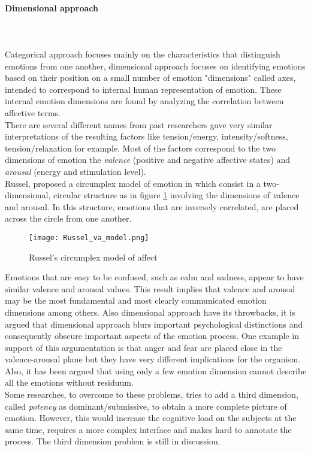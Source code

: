 \paragraph{Dimensional approach}
\mbox{} \\ \\ \indent
Categorical approach focuses mainly on the characteristics that distinguish emotions from one another, dimensional approach focuses on identifying emotions based on their position on a small number of emotion "dimensions" called axes, intended to correspond to internal human representation of emotion. These internal emotion dimensions are found by analyzing the correlation between affective terms.
\\ \indent
There are several different names from past researchers gave very similar interpretations of the resulting factors like tension/energy, intensity/softness, tension/relaxation for example. Most of the factors correspond to the two dimensions of emotion the \textit{valence} (positive and negative affective states) and \textit{arousal} (energy and stimulation level).
\\
Russel, proposed a circumplex model of emotion in \cite{russell1980circumplex} which consist in a two-dimensional, circular structure as in figure \ref{fig:Russel_va_model} involving the dimensions of valence and arousal. In this structure, emotions that are inversely correlated, are placed across the circle from one another.
\begin{figure}[h]
    \centering
    \texttt{[image: Russel\_va\_model.png]} 
	\caption{Russel's circumplex model of affect}
    \label{fig:Russel_va_model}
\end{figure}

Emotions that are easy to be confused, such as calm and sadness, appear to have similar valence and arousal values. This result implies that valence and arousal may be the most fundamental and most clearly communicated emotion dimensions among others.
Also dimensional approach have its throwbacks, it is argued that dimensional approach blurs important psychological distinctions and consequently obscure important aspects of the emotion process. One example in support of this argumentation is that anger and fear are placed close in the valence-arousal plane but they have very different implications for the organism. Also, it has been argued that using only a few emotion dimension cannot describe all the emotions without residuum.
\\ \indent
Some researches, to overcome to these problems, tries to add a third dimension, called \textit{potency} as dominant/submissive, to obtain a more complete picture of emotion. However, this would increase the cognitive load on the subjects at the same time, requires a more complex interface and makes hard to annotate the process. The third dimension problem is still in discussion.

